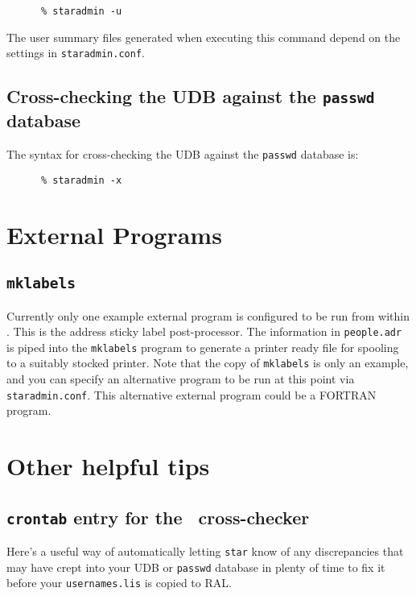 \begin{verbatim}
      % staradmin -u
\end{verbatim}

The user summary files generated when executing this command depend on the
settings in {\tt staradmin.conf}.

\subsection{Cross-checking the UDB against the {\tt passwd} database}

The syntax for cross-checking the UDB against the {\tt passwd} database is:

\begin{verbatim}
      % staradmin -x
\end{verbatim}

\section{External Programs}

\subsection{{\tt mklabels}}

Currently only one example external program is configured to be run from
within \staradmin. This is the address sticky label post-processor. The
information in {\tt people.adr} is piped into the {\tt mklabels} program
to generate a printer ready file for spooling to a suitably stocked
printer. Note that the copy of {\tt mklabels} is only an example, and you
can specify an alternative program to be run at this point via {\tt
staradmin.conf}. This alternative external program could be a {\sf
FORTRAN} program.


\section{Other helpful tips}

\subsection{{\tt crontab} entry for the \staradmin\ cross-checker}

Here's a useful way of automatically letting {\tt star} know of any
discrepancies that may have crept into your UDB or {\tt passwd} database
in plenty of time to fix it before your {\tt usernames.lis} is copied to
RAL.

